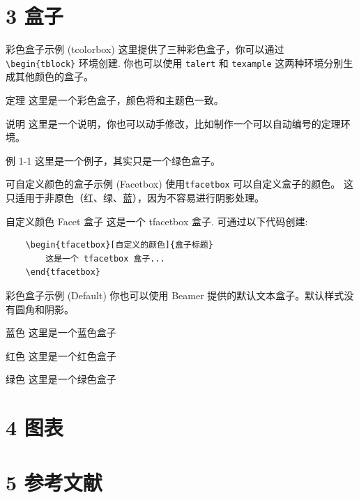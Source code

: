 \documentclass[10pt,aspectratio=169,fontset=none]{ctexbeamer}
\begin{document}
    \section{3 盒子}

    \begin{frame}{彩色盒子示例 (tcolorbox)}
        这里提供了三种彩色盒子，你可以通过 \texttt{\textbackslash begin\{tblock\}} 环境创建. 你也可以使用 \texttt{talert} 和 \texttt{texample} 这两种环境分别生成其他颜色的盒子。
        \begin{tblock}{定理}
            这里是一个彩色盒子，颜色将和主题色一致。
        \end{tblock}
        \begin{talert}{说明}
            这里是一个说明，你也可以动手修改，比如制作一个可以自动编号的定理环境。
        \end{talert}
        \begin{texample}{例 1-1}
            这里是一个例子，其实只是一个绿色盒子。
        \end{texample}
    \end{frame}

    \begin{frame}[fragile]{可自定义颜色的盒子示例 (Facetbox)}
        使用\texttt{tfacetbox} 可以自定义盒子的颜色。 这只适用于非原色（红、绿、蓝），因为不容易进行阴影处理。
        \begin{tfacetbox}[nudarkyellow]{自定义颜色 Facet 盒子}
            这是一个 tfacetbox 盒子. 可通过以下代码创建:
            \begin{verbatim}
    \begin{tfacetbox}[自定义的颜色]{盒子标题}
        这是一个 tfacetbox 盒子...
    \end{tfacetbox}
            \end{verbatim}
        \end{tfacetbox}
    \end{frame}

    \begin{frame}{彩色盒子示例 (Default)}
        你也可以使用 Beamer 提供的默认文本盒子。默认样式没有圆角和阴影。
        \begin{block}{蓝色}
            这里是一个蓝色盒子
        \end{block}
        \begin{alertblock}{红色}
            这里是一个红色盒子
        \end{alertblock}
        \begin{exampleblock}{绿色}
            这里是一个绿色盒子
        \end{exampleblock}
    \end{frame}

    \section{4 图表}

    \section{5 参考文献}

\end{document}

